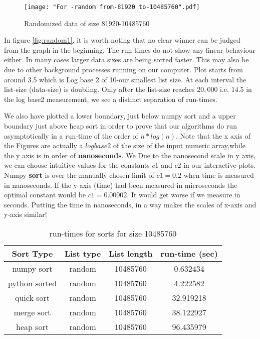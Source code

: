 \documentclass[sigconf, nonacm, natbib, screen, balance=False]{acmart}
\begin{document}
\begin{figure}[ht]
\texttt{[image: "For -random from-81920 to-10485760".pdf]}
    \caption{Randomized data of size 81920-10485760}
    \label{fig:random2}
\end{figure}

In figure \ref{fig:random1}, it is worth noting that no clear winner can be judged from the graph in the beginning. The run-times do not show any linear behaviour either. In many cases larger data sizes are being sorted faster. This may also be due to other background processes running on our computer. Plot starts from around 3.5 which is Log base 2 of 10-our smallest list size. At each interval the list-size (data-size) is doubling. Only after the list-size reaches \textbf{$20,000$} i.e. \textbf{$14.5$} in the log base2 measurement, we see a distinct separation of run-times.

We also have plotted a lower boundary, just below numpy sort and a upper boundary just above heap sort in order to prove that our algorithms do run asymptotically in a run-time of the order of \textbf{$n*log(n)$}. Note that the x axis of the Figures are actually a $log base 2$ of the size of the input numeric array,while the y axis is in order of \textbf{nanoseconds}. We  Due to the nanosecond scale in y axis, we can choose intuitive values for the constants $c1$ and $c2$  in our interactive plots. Numpy \textbf{sort} is over the manually chosen limit of \textbf{$c1=0.2$} when time is measured in nanoseconds. If the y axis (time) had been measured in microseconds the optimal constant would be $c1=0.00002$. It would get worse if we measure in seconds. Putting the time in nanoseconds, in a way makes the scales of x-axis and y-axis similar!

\begin{table}[ht]
\begin{center}
\begin{tabular}{|c|c|c|c|} 
\hline
Sort Type & List type & List length & run-time (sec) \\
\hline
numpy sort &	random &	10485760 &	0.632434 \\
python sorted &	random &	10485760 &	4.222582 \\
quick sort &	random &	10485760 &	32.919218 \\
merge sort &	random &	10485760 &	38.122927 \\
heap sort &	random &	10485760 &	96.435979 \\
\hline
\end{tabular}
\end{center}
\caption{run-times for sorts for size 10485760}
\label{tab:table1}
\end{table}
\end{document}
